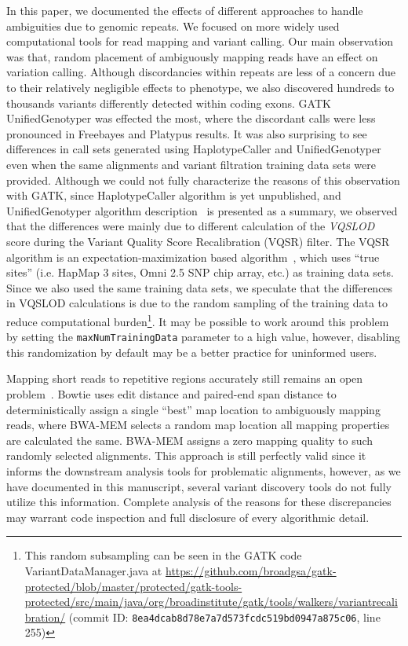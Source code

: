 \documentclass{bioinfo}
\begin{document}
\begin{methods}
In this paper, we documented the effects of different approaches to handle ambiguities due to genomic repeats. We focused on more widely used computational tools for read mapping and variant calling. Our main observation was that, random placement of ambiguously mapping reads have an effect on variation calling. Although discordancies within repeats are less of a concern due to their relatively negligible 
effects to phenotype, we also discovered hundreds to thousands variants differently detected within coding exons. GATK UnifiedGenotyper was effected the most, where the discordant calls were less pronounced in Freebayes and Platypus results. It was also surprising to see differences in call sets generated using HaplotypeCaller and UnifiedGenotyper even when the same alignments and variant filtration training data sets were provided. Although we could not fully characterize the reasons
of this observation with GATK, since HaplotypeCaller algorithm is yet unpublished, and UnifiedGenotyper algorithm description~\citep{DePristo2011} is presented as a summary, we observed that the differences were
mainly due to different calculation of the {\it VQSLOD} score during the Variant Quality Score Recalibration (VQSR) filter. The VQSR algorithm is an expectation-maximization based algorithm~\citep{DePristo2011},
which uses ``true sites'' (i.e. HapMap 3 sites, Omni 2.5 SNP chip array, etc.) as training data sets. Since we also used the same training data sets, 
we speculate that the differences in VQSLOD calculations is due to the random sampling of the training data
to reduce computational burden\footnote{This random subsampling can be seen in the GATK code VariantDataManager.java at \url{https://github.com/broadgsa/gatk-protected/blob/master/protected/gatk-tools-protected/src/main/java/org/broadinstitute/gatk/tools/walkers/variantrecalibration/} (commit ID: {\tt 8ea4dcab8d78e7a7d573fcdc519bd0947a875c06}, line 255)}. It may be possible to work around this problem by setting the {\tt maxNumTrainingData} parameter to a high value, however, disabling this randomization
by default may be a better practice for uninformed users.

Mapping short reads to repetitive regions accurately still remains an open problem~\citep{Treangen2012}. Bowtie uses %
edit distance and paired-end span distance 
to deterministically assign a single ``best'' map location to ambiguously mapping reads, where BWA-MEM selects a random map location all mapping properties are calculated the same. BWA-MEM assigns a zero mapping quality
to such randomly selected alignments. This approach is still perfectly valid since it informs the downstream analysis tools for problematic alignments, however, as we have documented in this manuscript, 
several variant discovery tools do not fully utilize this information. Complete analysis of the reasons for these discrepancies may warrant code inspection and full disclosure of every algorithmic detail.


\end{methods}
\end{document}
